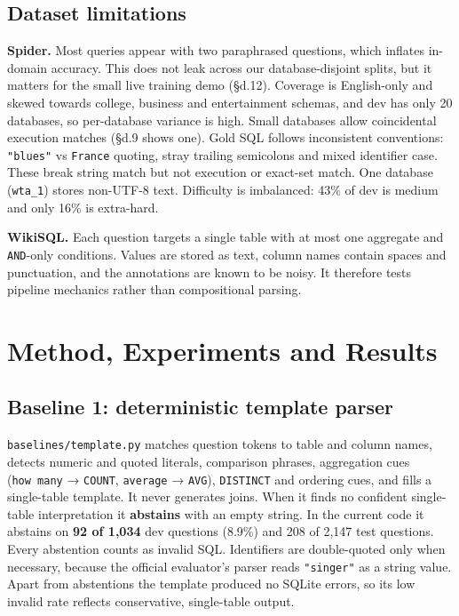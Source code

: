 \documentclass[
  10pt,
]{article}
\begin{document}
\subsection{Dataset limitations}\label{dataset-limitations}

\textbf{Spider.} Most queries appear with two paraphrased questions,
which inflates in-domain accuracy. This does not leak across our
database-disjoint splits, but it matters for the small live training
demo (§d.12). Coverage is English-only and skewed towards college,
business and entertainment schemas, and dev has only 20 databases, so
per-database variance is high. Small databases allow coincidental
execution matches (§d.9 shows one). Gold SQL follows inconsistent
conventions: \texttt{"blues"} vs
\texttt{\textquotesingle{}France\textquotesingle{}} quoting, stray
trailing semicolons and mixed identifier case. These break string match
but not execution or exact-set match. One database (\texttt{wta\_1})
stores non-UTF-8 text. Difficulty is imbalanced: 43\% of dev is medium
and only 16\% is extra-hard.

\textbf{WikiSQL.} Each question targets a single table with at most one
aggregate and \texttt{AND}-only conditions. Values are stored as text,
column names contain spaces and punctuation, and the annotations are
known to be noisy. It therefore tests pipeline mechanics rather than
compositional parsing.

\section{Method, Experiments and
Results}\label{method-experiments-and-results}

\subsection{Baseline 1: deterministic template
parser}\label{baseline-1-deterministic-template-parser}

\texttt{baselines/template.py} matches question tokens to table and
column names, detects numeric and quoted literals, comparison phrases,
aggregation cues (\texttt{how\ many} → \texttt{COUNT}, \texttt{average}
→ \texttt{AVG}), \texttt{DISTINCT} and ordering cues, and fills a
single-table template. It never generates joins. When it finds no
confident single-table interpretation it \textbf{abstains} with an empty
string. In the current code it abstains on \textbf{92 of 1,034} dev
questions (8.9\%) and 208 of 2,147 test questions. Every abstention
counts as invalid SQL. Identifiers are double-quoted only when
necessary, because the official evaluator's parser reads
\texttt{"singer"} as a string value. Apart from abstentions the template
produced no SQLite errors, so its low invalid rate reflects
conservative, single-table output.
\end{document}
